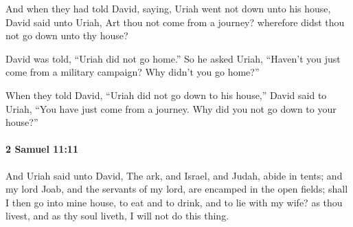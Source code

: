 			\begin{versebox}
					\item[BHS] 
					\item[ASV] And when they had told David, saying, Uriah went not down unto his house, David said unto Uriah, Art thou not come from a journey? wherefore didst thou not go down unto thy house?
					\item[NIV] David was told, “Uriah did not go home.” So he asked Uriah, “Haven’t you just come from a military campaign? Why didn’t you go home?”
					\item[NRSV] When they told David, “Uriah did not go down to his house,” David said to Uriah, “You have just come from a journey. Why did you not go down to your house?”
			\end{versebox}

		\paragraph{2 Samuel 11:11} %
			\label{2SAMUEL-11-11}

			And Uriah said unto David, The ark, and Israel, and Judah, abide in tents; and my lord Joab, and the servants of my lord, are encamped in the open fields; shall I then go into mine house, to eat and to drink, and to lie with my wife? as thou livest, and as thy soul liveth, I will not do this thing.

